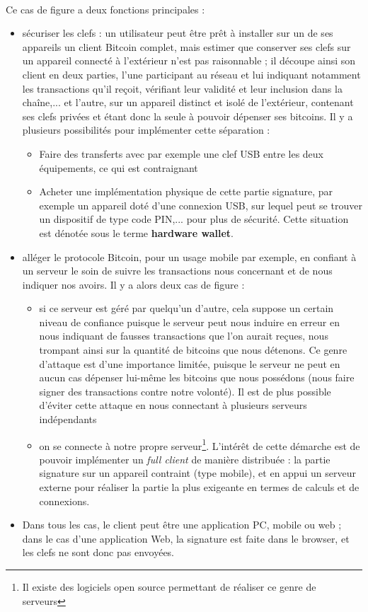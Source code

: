 \documentclass[11pt,a4paper]{article}
\begin{document}
 \\Ce cas de figure a deux fonctions principales :\begin{itemize}
	\item sécuriser les clefs : un utilisateur peut être prêt à installer sur un de ses appareils un client Bitcoin complet, mais estimer que conserver ses clefs sur un appareil connecté à l'extérieur n'est pas raisonnable ; il découpe ainsi son client en deux parties, l'une participant au réseau et lui indiquant notamment les transactions qu'il reçoit, vérifiant leur validité et leur inclusion dans la chaîne,... et l'autre, sur un appareil distinct et isolé de l'extérieur, contenant ses clefs privées et étant donc la seule à pouvoir dépenser ses bitcoins. Il y a plusieurs possibilités pour implémenter cette séparation :\begin{itemize}
		\item Faire des transferts avec par exemple une clef USB entre les deux équipements, ce qui est contraignant
		\item Acheter une implémentation physique de cette partie signature, par exemple un appareil doté d'une connexion USB, sur lequel peut se trouver un dispositif de type code PIN,... pour plus de sécurité. Cette situation est dénotée sous le terme \textbf{hardware wallet}.
	\end{itemize}
	\item alléger le protocole Bitcoin, pour un usage mobile par exemple, en confiant à un serveur le soin de suivre les transactions nous concernant et de nous indiquer nos avoirs. Il y a alors deux cas de figure : \begin{itemize}
		\item si ce serveur est géré par quelqu'un d'autre, cela suppose un certain niveau de confiance puisque le serveur peut nous induire en erreur en nous indiquant de fausses transactions que l'on aurait reçues, nous trompant ainsi sur la quantité de bitcoins que nous détenons. Ce genre d'attaque est d'une importance limitée, puisque le serveur ne peut en aucun cas dépenser lui-même les bitcoins que nous possédons (nous faire signer des transactions contre notre volonté). Il est de plus possible d'éviter cette attaque en nous connectant à plusieurs serveurs indépendants
		\item on se connecte à notre propre serveur\footnote{Il existe des logiciels open source permettant de réaliser ce genre de serveurs}. L'intérêt de cette démarche est de pouvoir implémenter un \textit{full client} de manière distribuée : la partie signature sur un appareil contraint (type mobile), et en appui un serveur externe pour réaliser la partie la plus exigeante en termes de calculs et de connexions.
	\end{itemize}
	\item Dans tous les cas, le client peut être une application PC, mobile ou web ; dans le cas d'une application Web, la signature est faite dans le browser, et les clefs ne sont donc pas envoyées. 
\end{itemize}
\end{document}

